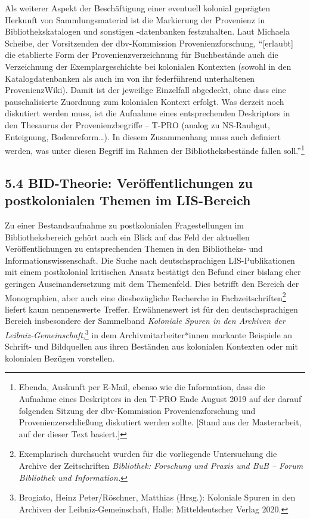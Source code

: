 \documentclass[a4paper,
fontsize=11pt,
oneside,
numbers=noperiodatend,
parskip=half-,
bibliography=totoc,
final
]{scrartcl}
\begin{document}
Als weiterer Aspekt der Beschäftigung einer eventuell kolonial geprägten
Herkunft von Sammlungsmaterial ist die Markierung der Provenienz in
Bibliothekskatalogen und sonstigen -datenbanken festzuhalten. Laut
Michaela Scheibe, der Vorsitzenden der dbv-Kommission
Provenienzforschung, \enquote{{[}erlaubt{]} die etablierte Form der
Provenienzverzeichnung für Buchbestände auch die Verzeichnung der
Exemplargeschichte bei kolonialen Kontexten (sowohl in den
Katalogdatenbanken als auch im von ihr federführend unterhaltenen
ProvenienzWiki). Damit ist der jeweilige Einzelfall abgedeckt, ohne dass
eine pauschalisierte Zuordnung zum kolonialen Kontext erfolgt. Was
derzeit noch diskutiert werden muss, ist die Aufnahme eines
entsprechenden Deskriptors in den Thesaurus der Provenienzbegriffe --
T-PRO (analog zu NS-Raubgut, Enteignung, Bodenreform\ldots). In diesem
Zusammenhang muss auch definiert werden, was unter diesen Begriff im
Rahmen der Bibliotheksbestände fallen soll.}\footnote{Ebenda, Auskunft
  per E-Mail, ebenso wie die Information, dass die Aufnahme eines
  Deskriptors in den T-PRO Ende August 2019 auf der darauf folgenden
  Sitzung der dbv-Kommission Provenienzforschung und
  Provenienzerschließung diskutiert werden sollte. {[}Stand aus der
  Masterarbeit, auf der dieser Text basiert.{]}}

\hypertarget{bid-theorie-veruxf6ffentlichungen-zu-postkolonialen-themen-im-lis-bereich}{%
\subsection{5.4 BID-Theorie: Veröffentlichungen zu postkolonialen Themen
im
LIS-Bereich}\label{bid-theorie-veruxf6ffentlichungen-zu-postkolonialen-themen-im-lis-bereich}}

Zu einer Bestandsaufnahme zu postkolonialen Fragestellungen im
Bibliotheksbereich gehört auch ein Blick auf das Feld der aktuellen
Veröffentlichungen zu entsprechenden Themen in den Bibliotheks- und
Informationswissenschaft. Die Suche nach deutschsprachigen
LIS-Publikationen mit einem postkolonial kritischen Ansatz bestätigt den
Befund einer bislang eher geringen Auseinandersetzung mit dem
Themenfeld. Dies betrifft den Bereich der Monographien, aber auch eine
diesbezügliche Recherche in Fachzeitschriften\footnote{Exemplarisch
  durchsucht wurden für die vorliegende Untersuchung die Archive der
  Zeitschriften \emph{Bibliothek: Forschung und Praxis und BuB -- Forum
  Bibliothek und Information.}} liefert kaum nennenswerte Treffer.
Erwähnenswert ist für den deutschsprachigen Bereich insbesondere der
Sammelband \emph{Koloniale Spuren in den Archiven der
Leibniz-Gemeinschaft},\footnote{Brogiato, Heinz Peter/Röschner, Matthias
  (Hrsg.): Koloniale Spuren in den Archiven der Leibniz-Gemeinschaft,
  Halle: Mitteldeutscher Verlag 2020.} in dem Archivmitarbeiter*innen
markante Beispiele an Schrift- und Bildquellen aus ihren Beständen aus
kolonialen Kontexten oder mit kolonialen Bezügen vorstellen.
\end{document}

